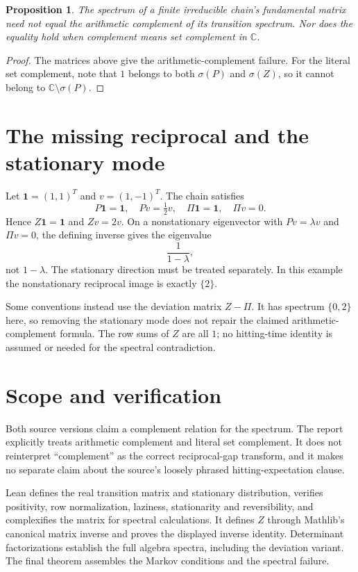 \documentclass[11pt]{article}
\newtheorem{proposition}{Proposition}
\begin{document}
\newpage
\begin{proposition}
The spectrum of a finite irreducible chain's fundamental matrix need not equal the arithmetic complement of its transition spectrum. Nor does the equality hold when complement means set complement in $\mathbb C$.
\end{proposition}
\begin{proof}
The matrices above give the arithmetic-complement failure. For the literal set complement, note that $1$ belongs to both $\sigma(P)$ and $\sigma(Z)$, so it cannot belong to $\mathbb C\setminus\sigma(P)$.
\end{proof}

\section*{The missing reciprocal and the stationary mode}
Let $\mathbf 1=(1,1)^T$ and $v=(1,-1)^T$. The chain satisfies
\[
 P\mathbf1=\mathbf1,\quad Pv=\tfrac12 v,\quad
 \Pi\mathbf1=\mathbf1,\quad\Pi v=0.
\]
Hence $Z\mathbf1=\mathbf1$ and $Zv=2v$. On a nonstationary eigenvector with $Pv=\lambda v$ and $\Pi v=0$, the defining inverse gives the eigenvalue
\[
 \frac{1}{1-\lambda},
\]
not $1-\lambda$. The stationary direction must be treated separately. In this example the nonstationary reciprocal image is exactly $\{2\}$.

Some conventions instead use the deviation matrix $Z-\Pi$. It has spectrum $\{0,2\}$ here, so removing the stationary mode does not repair the claimed arithmetic-complement formula. The row sums of $Z$ are all $1$; no hitting-time identity is assumed or needed for the spectral contradiction.

\section*{Scope and verification}
Both source versions claim a complement relation for the spectrum. The report explicitly treats arithmetic complement and literal set complement. It does not reinterpret ``complement'' as the correct reciprocal-gap transform, and it makes no separate claim about the source's loosely phrased hitting-expectation clause.

Lean defines the real transition matrix and stationary distribution, verifies positivity, row normalization, laziness, stationarity and reversibility, and complexifies the matrix for spectral calculations. It defines $Z$ through Mathlib's canonical matrix inverse and proves the displayed inverse identity. Determinant factorizations establish the full algebra spectra, including the deviation variant. The final theorem assembles the Markov conditions and the spectral failure.
\end{document}
